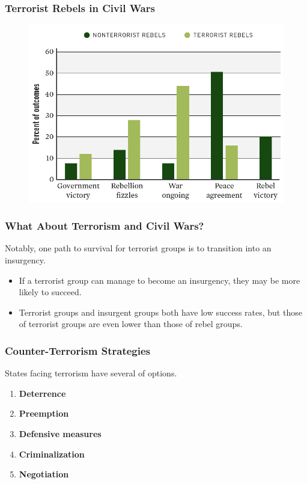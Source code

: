 \documentclass[handout]{beamer}
\begin{document}
\begin{frame} 
\frametitle{\LARGE{Terrorist Rebels in Civil Wars}}
\begin{figure}[ht!]
	\centering
	\includegraphics[width=\textwidth,height=0.8\textheight,keepaspectratio]{./terr_success.png}
\end{figure}
\end{frame}

\begin{frame} 
	\frametitle{\LARGE{What About Terrorism and Civil Wars?}}
Notably, one path to survival for terrorist groups is to transition into an insurgency.
	\begin{itemize}
		\item If a terrorist group can manage to become an insurgency, they may be more likely to succeed. \pause
		\item Terrorist groups and insurgent groups both have low success rates, but those of terrorist groups are even lower than those of rebel groups. 
	\end{itemize}
\end{frame}

\begin{frame} 
	\frametitle{\LARGE{Counter-Terrorism Strategies}}
	States facing terrorism have several of options.
	\begin{enumerate}
		\item \textbf{Deterrence}
		\item \textbf{Preemption}
		\item \textbf{Defensive measures}
		\item \textbf{Criminalization} 
		\item \textbf{Negotiation}
	\end{enumerate}
\end{frame}
\end{document}

